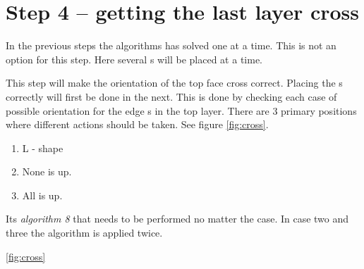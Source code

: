 \section{Step 4 --  getting the last layer cross}
In the previous steps the algorithms has solved one \cpiece{} at a time. 
This is not an option for this step. 
Here several \cpiece{}s will be placed at a time. 

This step will make the orientation of the top face cross correct. 
Placing the \cpiece{}s correctly will first be done in the next. 
This is done by checking each case of possible orientation for the edge \cpiece{}s in the top layer. 
There are 3 primary positions where different actions should be taken. See figure \ref{fig:cross}. 
\begin{enumerate}
\item L - shape
\item None is up.
\item All is up.
\end{enumerate}
Its \textit{algorithm 8} that needs to be performed no matter the case. In case two and three the algorithm is applied twice. 

\ref{fig:cross}


